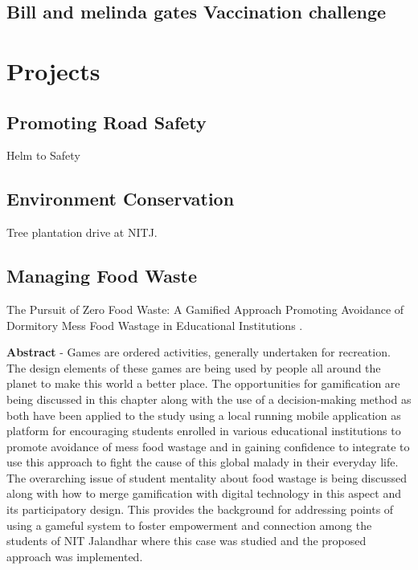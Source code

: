 \documentclass[
]{book}
\begin{document}
\hypertarget{bill-and-melinda-gates-vaccination-challenge}{%
\section{Bill and melinda gates Vaccination challenge}\label{bill-and-melinda-gates-vaccination-challenge}}

\hypertarget{projects}{%
\chapter{Projects}\label{projects}}

\hypertarget{promoting-road-safety}{%
\section{Promoting Road Safety}\label{promoting-road-safety}}

Helm to Safety

\hypertarget{environment-conservation}{%
\section{Environment Conservation}\label{environment-conservation}}

Tree plantation drive at NITJ.

\hypertarget{managing-food-waste}{%
\section{Managing Food Waste}\label{managing-food-waste}}

The Pursuit of Zero Food Waste: A Gamified Approach Promoting Avoidance of Dormitory Mess Food Wastage in Educational Institutions \citep{jain_pursuit_2019}.

\textbf{Abstract} - Games are ordered activities, generally undertaken for recreation. The design elements of these games are being used by people all around the planet to make this world a better place. The opportunities for gamification are being discussed in this chapter along with the use of a decision-making method as both have been applied to the study using a local running mobile application as platform for encouraging students enrolled in various educational institutions to promote avoidance of mess food wastage and in gaining confidence to integrate to use this approach to fight the cause of this global malady in their everyday life. The overarching issue of student mentality about food wastage is being discussed along with how to merge gamification with digital technology in this aspect and its participatory design. This provides the background for addressing points of using a gameful system to foster empowerment and connection among the students of NIT Jalandhar where this case was studied and the proposed approach was implemented.
\end{document}
